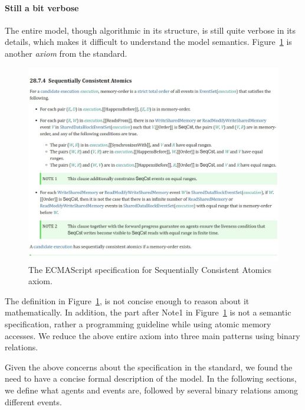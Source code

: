 \paragraph{Still a bit verbose}
    
    The entire model, though algorithmic in its structure, is still quite verbose in its details, which makes it difficult to understand the model semantics. 
    Figure~\ref{model:Std3} is another \textit{axiom} from the standard. 
    \begin{figure}[H]
        \centering 
        \includegraphics[scale=0.6]{3.ECMAScriptMemoryModel/ECMAScriptStdSeqCnsAt.pdf}
        \caption{The ECMAScript specification for Sequentially Consistent Atomics axiom.}
        \label{model:Std3}
    \end{figure}
    The definition in Figure~\ref{model:Std3}, is not concise enough to reason about it mathematically. 
    In addition, the part after Note1 in Figure~\ref{model:Std3} is not a semantic specification, rather a programming guideline while using 
    atomic memory accesses. 
    We reduce the above entire axiom into three main patterns using binary relations.

Given the above concerns about the specification in the standard, we found the need to have a concise formal description of the model. 
In the following sections, we define what agents and events are, followed by several binary relations among different events.

